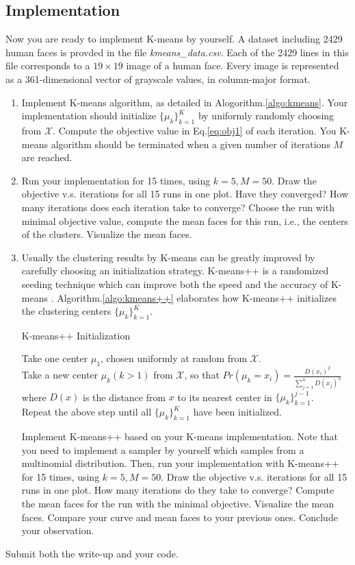 \subsection{Implementation}
Now you are ready to implement K-means by yourself. A dataset including 2429 human faces is provded in the file \emph{kmeans\_data.csv}. Each of the 2429 lines in this file corresponds to a $19 \times 19$ image of a human face. Every image is represented as a 361-dimensional vector of grayscale values, in column-major format.
\begin{enumerate}
\item Implement K-means algorithm, as detailed in Alogorithm.\ref{algo:kmeans}. Your implementation should initialize $\{\mu_k\}_{k=1}^K$ by uniformly randomly choosing from $\mathcal{X}$. Compute the objective value in Eq.\ref{eq:obj1} of each iteration. You K-means algorithm should be terminated when a given number of iterations $M$ are reached.

\item Run your implementation for 15 times, using $k=5, M = 50$. Draw the objective v.s. iterations for all 15 runs in one plot. Have they converged? How many iterations does each iteration take to converge?  Choose the run with minimal objective value, compute the mean faces for this run, i.e., the centers of the clusters. Visualize the mean faces.

\item Usually the clustering results by K-means can be greatly improved by carefully choosing an initialization strategy. K-means++ is a randomized seeding technique which can improve both the speed and the accuracy of K-means \cite{arthur2007k}. Algorithm.\ref{algo:kmeans++} elaborates how K-means++ initializes the clustering centers $\{\mu_k\}_{k=1}^K$.
\begin{algorithm}[]
\label{algo:kmeans++}
\caption{K-means++ Initialization}
\setcounter{AlgoLine}{0}
Take one center $\mu_1$, chosen uniformly at random from $\mathcal{X}$.\\
Take a new center $\mu_k (k>1)$ from $\mathcal{X}$, so that $Pr(\mu_k = x_i) = \frac{D(x_i)^2}{\sum_{j=1}^n D(x_j)^2}$ where $D(x)$ is the distance from $x$ to its nearest center in $\{\mu_k\}_{k=1}^{j-1}$.\\
Repeat the above step until all $\{\mu_k\}_{k=1}^K$ have been initialized.
\end{algorithm}

Implement K-means++ based on your K-means implementation. Note that you need to implement a sampler by yourself which samples from a multinomial distribution. Then, run your implementation with K-means++ for 15 times, using $k=5, M=50$. Draw the objective v.s. iterations for all 15 runs in one plot. How many iterations do they take to converge? Compute the mean faces for the run with the minimal objective. Visualize the mean faces. Compare your curve and mean faces to your previous ones. Conclude your observation.


\end{enumerate}

Submit both the write-up and your code. 

